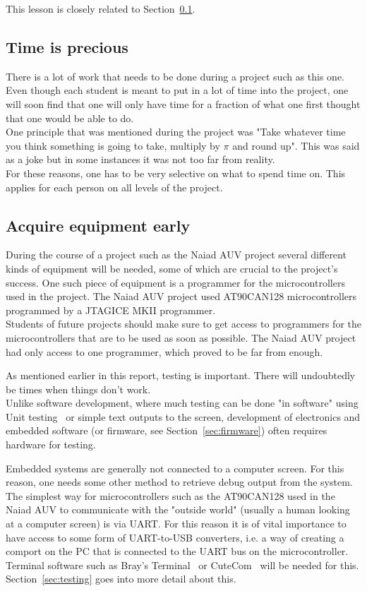 This lesson is closely related to Section~\ref{sec:time}.

\subsection{Time is precious}\label{sec:time}
There is a lot of work that needs to be done during a project such as this one. Even though each student is meant to put in a lot of time into the project, one will soon find that one will only have time for a fraction of what one first thought that one would be able to do. \\
One principle that was mentioned during the project was "Take whatever time you think something is going to take, multiply by $\pi$ and round up". This was said as a joke but in some instances it was not too far from reality. \\
For these reasons, one has to be very selective on what to spend time on. This applies for each person on all levels of the project.

\subsection{Acquire equipment early}\label{sec:equipment}
During the course of a project such as the Naiad AUV project several different kinds of equipment will be needed, some of which are crucial to the project's success. One such piece of equipment is a programmer for the microcontrollers used in the project. The Naiad AUV project used AT90CAN128 microcontrollers programmed by a JTAGICE MKII programmer. \\
Students of future projects should make sure to get access to programmers for the microcontrollers that are to be used as soon as possible. The Naiad AUV project had only access to one programmer, which proved to be far from enough.

As mentioned earlier in this report, testing is important. There will undoubtedly be times when things don't work. \\
Unlike software development, where much testing can be done "in software" using Unit testing~\cite{web:wiki_unit_testing} or simple text outputs to the screen, development of electronics and embedded software (or firmware, see Section~\ref{sec:firmware}) often requires hardware for testing.

Embedded systems are generally not connected to a computer screen. For this reason, one needs some other method to retrieve debug output from the system. \\
The simplest way for microcontrollers such as the AT90CAN128 used in the Naiad AUV to communicate with the "outside world" (usually a human looking at a computer screen) is via UART. For this reason it is of vital importance to have access to some form of UART-to-USB converters, i.e. a way of creating a comport on the PC that is connected to the UART bus on the microcontroller. Terminal software such as Bray's Terminal~\cite{web:brays_terminal} or  CuteCom~\cite{web:cutecom_terminal} will be needed for this. \\
Section~\ref{sec:testing} goes into more detail about this.

